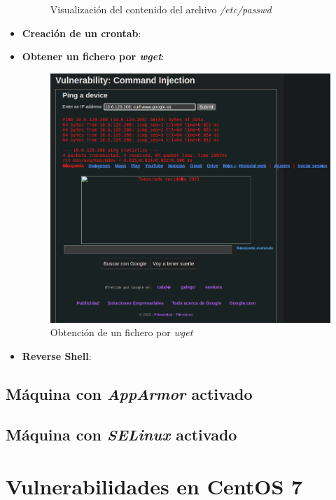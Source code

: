 \documentclass[11pt]{report}
\begin{document}
\begin{itemize}
\begin{figure}[H]
          \caption{Visualización del contenido del archivo \emph{/etc/passwd}}
        \end{figure}
  \item \textbf{Creación de un crontab}:
  \item \textbf{Obtener un fichero por \emph{wget}}:
        \begin{figure}[H]
          \centering
          \includegraphics[scale=0.4]{img/UbuntuServer/UbuntuServer_Base_6.png}
          \caption{Obtención de un fichero por \emph{wget}}
        \end{figure}
  \item \textbf{Reverse Shell}:
\end{itemize}

\subsection{Máquina con \emph{AppArmor} activado}
\subsection{Máquina con \emph{SELinux} activado}

\section{Vulnerabilidades en CentOS 7}
\end{document}
